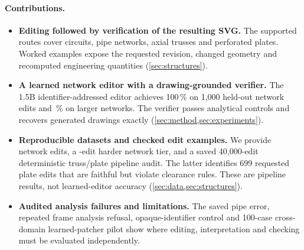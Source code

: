 \paragraph{Contributions.}
\begin{itemize}
\item \textbf{Editing followed by verification of the resulting SVG.} The supported routes cover
circuits, pipe networks, axial trusses and perforated plates. Worked examples expose the requested
revision, changed geometry and recomputed engineering quantities (\cref{sec:structures}).
\item \textbf{A learned network editor with a drawing-grounded verifier.} The 1.5B identifier-addressed
editor achieves 100\,\% on 1,000 held-out network edits and \editOneFiveHard\,\% on larger networks.
The verifier passes \numControls{} analytical controls and recovers \roundTripTotal{} generated drawings
exactly (\cref{sec:method,sec:experiments}).
\item \textbf{Reproducible datasets and checked edit examples.} We provide \netEdits{} network edits,
a \hardEdits{}-edit harder network tier, and a saved 40,000-edit deterministic truss/plate pipeline audit.
The latter identifies 699 requested plate edits that are faithful but violate clearance rules.
These are pipeline results, not learned-editor accuracy (\cref{sec:data,sec:structures}).
\item \textbf{Audited analysis failures and limitations.} The saved \astra pipe error, repeated frame
analysis refusal, opaque-identifier control and 100-case cross-domain learned-patcher pilot show where
editing, interpretation and checking must be evaluated independently.
\end{itemize}
